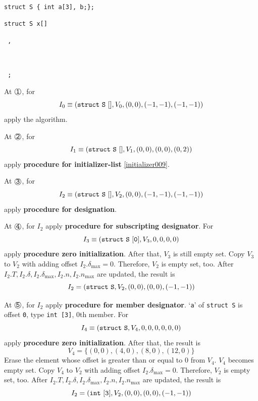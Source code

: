 \begin{Example}

\

{\tt struct S \{ int a[3], b;\}; }

{\tt struct S x[] 
}

{\tt
{}
,
}

{\tt
{}
}

{\tt
{};
}

\noindent
At $\MARU{\tt 1}$, for
\[
I_0 \equiv ({\tt{struct\,\,S\,\,[]}}, V_0, (0,0),(-1,-1),(-1,-1))
\]
apply the algorithm.

\noindent
At $\MARU{\tt 2}$, for
\[
I_1 \equiv ({\tt{struct\,\,S\,\,[]}},V_1,(0,0),(0,0),(0,2)) 
\]
apply  {\bf procedure for initializer-list} \ref{initializer009}.

\noindent
At $\MARU{\tt 3}$, for
\[
I_2 \equiv ({\tt struct\,\,S\,\,[]}, V_2, (0,0), (-1,-1),(-1,-1))
\]
apply {\bf procedure for designation}.

\noindent
At $\MARU{\tt 4}$, for $I_2$ apply
{\bf procedure for subscripting designator}.
For
\[
 I_3 \equiv ({\tt{struct\,\,S\,\,[0]}},V_3,0,0,0,0)
\]
apply {\bf procedure zero initialization}.
After that, $V_3$ is still empty set.
Copy $V_3$ to $V_2$ with adding offset $I_2.\delta_{\max} = 0$.
Therefore, $V_2$ is empty set, too.
After $I_2.T, I_2.{\delta}, I_2.{\delta}_{\max}, I_2.n, I_2.n_{\max}$
are updated, the result is
\[
I_2 = ({\tt struct\,\,S}, V_2, (0,0), (0,0),(-1,-1))
\]

\noindent
At $\MARU{\tt 5}$, for $I_2$
apply {\bf procedure for member designator}.
`{\tt a}' of {\tt struct S} is offset {\tt{0}},
type {\tt int [3]}, $0$th member.
For
\[
 I_4 \equiv ({\tt{struct\,\,S}},V_4,0,0,0,0,0,0)
\]
apply {\bf procedure zero initialization}.
After that, the result is
\[
 V_4 = \{(0,0),(4,0),(8,0),(12,0)\}
\]
Erase the element whose offset is greater than or equal to $0$ from
$V_4$. $V_4$ becomes empty set. Copy $V_4$ to $V_2$ with adding offset
$I_2.\delta_{\max} = 0$. Therefore, $V_2$ is empty set, too.
After $I_2.T, I_2.{\delta}, I_2.{\delta}_{\max}, I_2.n, I_2.n_{\max}$
are updated, the result is
\[
I_2 = ({\tt int\,\,[3]}, V_2, (0,0), (0,0),(-1,-1))
\]


\end{Example}

